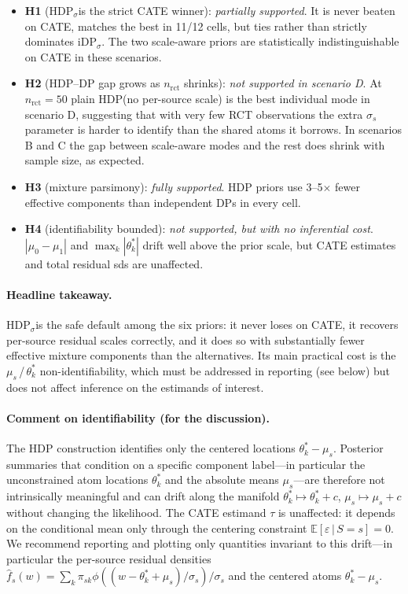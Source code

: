 \documentclass[11pt]{article}
\theoremstyle{plain}
\theoremstyle{definition}
\theoremstyle{remark}
\newcommand{\E}{\mathbb{E}}
\newcommand{\1}{\mathds{1}}
\newcommand{\given}{\,|\,}
\newcommand{\miDPs}{\ensuremath{\mathrm{iDP}_\sigma}}
\newcommand{\mHDP}{\ensuremath{\mathrm{HDP}}}
\newcommand{\mHDPs}{\ensuremath{\mathrm{HDP}_\sigma}}
\begin{document}
\begin{itemize}
  \item \textbf{H1} (\mHDPs is the strict CATE
    winner): \emph{partially supported}. It is never beaten on CATE,
    matches the best in 11/12 cells, but ties rather than strictly
    dominates \miDPs. The two scale-aware priors
    are statistically indistinguishable on CATE in these scenarios.
  \item \textbf{H2} (HDP--DP gap grows as $n_{\text{rct}}$ shrinks):
    \emph{not supported in scenario D}. At $n_{\text{rct}} = 50$
    plain \mHDP (no per-source scale) is the best
    individual mode in scenario D, suggesting that with very few RCT
    observations the extra $\sigma_s$ parameter is harder to identify
    than the shared atoms it borrows. In scenarios B and C the gap
    between scale-aware modes and the rest does shrink with sample
    size, as expected.
  \item \textbf{H3} (mixture parsimony): \emph{fully supported}.
    HDP priors use 3--5$\times$ fewer effective components than
    independent DPs in every cell.
  \item \textbf{H4} (identifiability bounded): \emph{not supported,
    but with no inferential cost}. $|\mu_0 - \mu_1|$ and
    $\max_k |\theta_k^*|$ drift well above the prior scale, but CATE
    estimates and total residual sds are unaffected.
\end{itemize}

\paragraph{Headline takeaway.}
\mHDPs is the safe default among the six priors:
it never loses on CATE, it recovers per-source residual scales
correctly, and it does so with substantially fewer effective mixture
components than the alternatives. Its main practical cost is the
$\mu_s$\,/\,$\theta_k^*$ non-identifiability, which must be addressed
in reporting (see below) but does not affect inference on the
estimands of interest.

\paragraph{Comment on identifiability (for the discussion).}
The HDP construction identifies only the centered locations
$\theta_k^* - \mu_s$. Posterior summaries that condition on a specific
component label---in particular the unconstrained atom locations
$\theta_k^*$ and the absolute means $\mu_s$---are therefore not
intrinsically meaningful and can drift along the manifold
$\theta_k^* \mapsto \theta_k^* + c$, $\mu_s \mapsto \mu_s + c$ without
changing the likelihood. The CATE estimand $\tau$ is unaffected: it
depends on the conditional mean only through the centering constraint
$\E[\varepsilon \given S = s] = 0$. We recommend reporting and
plotting only quantities invariant to this drift---in particular the
per-source residual densities
$\hat f_s(w) = \sum_k \pi_{sk} \phi\!\left((w - \theta_k^* + \mu_s) / \sigma_s\right)/\sigma_s$
and the centered atoms $\theta_k^* - \mu_s$.
\end{document}
